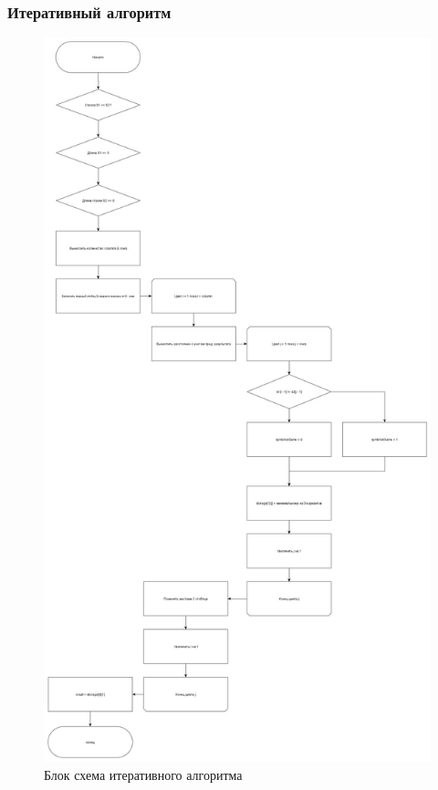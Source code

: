 \documentclass[a4paper, 14pt]{article}
\begin{document}
	\subsubsection{Итеративный алгоритм}
	\begin{figure}
		\centering
		\includegraphics[width=0.7\linewidth]{img/2}
		\caption{Блок схема итеративного алгоритма}
		\label{fig:2}
	\end{figure}
	
	
\end{document}
